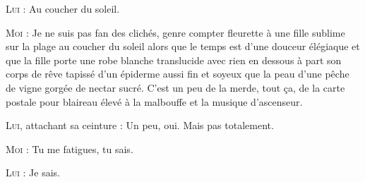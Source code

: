 \begin{dialogue}
\textsc{Lui} : Au coucher du soleil.

\textsc{Moi} : Je ne suis pas fan des clichés, genre compter fleurette à une fille sublime sur la plage au coucher du soleil alors que le temps est d’une douceur élégiaque et que la fille porte une robe blanche translucide avec rien en dessous à part son corps de rêve tapissé d’un épiderme aussi fin et soyeux que la peau d’une pêche de vigne gorgée de nectar sucré. C’est un peu de la merde, tout ça, de la carte postale pour blaireau élevé à la malbouffe et la musique d’ascenseur.

\textsc{Lui}, attachant sa ceinture : Un peu, oui. Mais pas totalement.

\textsc{Moi} : Tu me fatigues, tu sais.

\textsc{Lui} : Je sais.

\end{dialogue}

